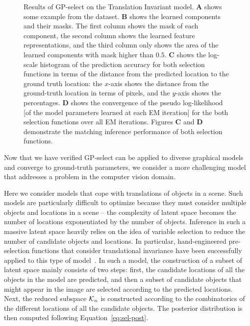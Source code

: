 \begin{figure}[t]

\caption{Results of GP-select on the Translation Invariant model.
\textbf{A} shows some example from the dataset.
\textbf{B} shows the learned components and their masks. The first column shows the mask of each component, the second column shows the learned feature representations, and the third column only shows the area of the learned components with mask higher than $0.5$.
\textbf{C} shows the log-scale histogram of the prediction accuracy for both selection functions in terms of the distance from the predicted location to the ground truth location: the $x$-axis shows the distance from the ground-truth location in terms of pixels, and the $y$-axis shows the percentages.
\textbf{D} shows the convergence of the pseudo log-likelihood [of the model parameters learned at each EM iteration] for the both selection functions over all EM iterations. Figures \textbf{C} and \textbf{D} demonstrate the matching inference performance of both selection functions. %
}
\label{fig:inveca}
\end{figure}

Now that we have verified GP-select can be applied to diverse graphical models and converge to ground-truth parameters, we consider a more challenging model that addresses a problem in the computer vision domain.

Here we consider models that cope with translations of objects in a scene.
Such models are particularly difficult to optimize because they must consider multiple objects and locations in a scene -- the complexity of latent space becomes the number of locations exponentiated by the number of objects.
Inference in such a massive latent space heavily relies on the idea of variable selection to reduce the number of candidate objects and locations. In particular, hand-engineered pre-selection functions that consider translational invariance have been successfully applied to this type of model~\citep{DaiLucke2012b,DaiLucke2014,DaiEtAl2013}.
%
In such a model, the construction of a subset of latent space mainly consists of two steps: first, the candidate locations of all the objects in the model are predicted, and then a subset of candidate objects that might appear in the image are selected according to the predicted locations.  Next, the reduced subspace $\mathcal{K}_{n}$ is constructed according to the combinatorics of the different locations of all the candidate objects.
The posterior distribution is then computed following Equation~\eqref{eq:sel-post}.

